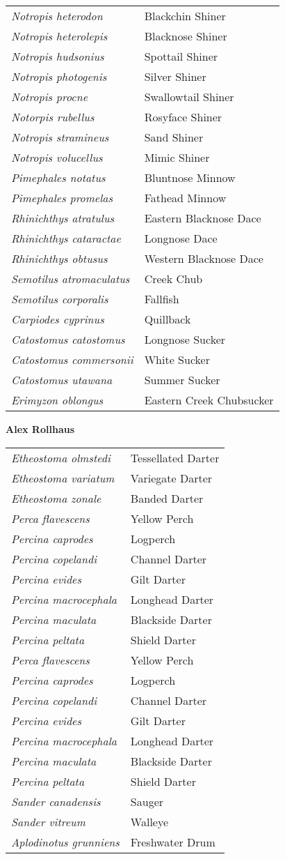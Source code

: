 \documentclass[11pt]{article}
\begin{document}
%
\textbf{\Student}

\begin{tabular}{@{}L{3in}L{3in}@{}}
\textit{Notropis heterodon} & Blackchin Shiner\tabularnewline
\textit{Notropis heterolepis} & Blacknose Shiner\tabularnewline
\textit{Notropis hudsonius} & Spottail Shiner\tabularnewline
\textit{Notropis photogenis} & Silver Shiner\tabularnewline
\textit{Notropis procne} & Swallowtail Shiner\tabularnewline
\textit{Notorpis rubellus} & Rosyface Shiner\tabularnewline
\textit{Notropis stramineus} & Sand Shiner\tabularnewline
\textit{Notropis volucellus} & Mimic Shiner\tabularnewline
\textit{Pimephales notatus} & Bluntnose Minnow\tabularnewline
\textit{Pimephales promelas} & Fathead Minnow\tabularnewline
\textit{Rhinichthys atratulus} & Eastern Blacknose Dace\tabularnewline
\textit{Rhinichthys cataractae} & Longnose Dace\tabularnewline
\textit{Rhinichthys obtusus} & Western Blacknose Dace\tabularnewline
\textit{Semotilus atromaculatus} & Creek Chub\tabularnewline
\textit{Semotilus corporalis} & Fallfish\tabularnewline
\textit{Carpiodes cyprinus} & Quillback\tabularnewline
\textit{Catostomus catostomus} & Longnose Sucker\tabularnewline
\textit{Catostomus commersonii} & White Sucker\tabularnewline
\textit{Catostomus utawana} & Summer Sucker\tabularnewline
\textit{Erimyzon oblongus} & Eastern Creek Chubsucker\tabularnewline
\end{tabular}

\newpage

\textbf{Alex Rollhaus}

\begin{tabular}{@{}L{3in}L{3in}@{}}
\textit{Etheostoma olmstedi} & Tessellated Darter\tabularnewline
\textit{Etheostoma variatum} & Variegate Darter\tabularnewline
\textit{Etheostoma zonale} & Banded Darter\tabularnewline
\textit{Perca flavescens} & Yellow Perch\tabularnewline
\textit{Percina caprodes} & Logperch\tabularnewline
\textit{Percina copelandi} & Channel Darter\tabularnewline
\textit{Percina evides} & Gilt Darter\tabularnewline
\textit{Percina macrocephala} & Longhead Darter\tabularnewline
\textit{Percina maculata} & Blackside Darter\tabularnewline
\textit{Percina peltata} & Shield Darter\tabularnewline
\textit{Perca flavescens} & Yellow Perch\tabularnewline
\textit{Percina caprodes} & Logperch\tabularnewline
\textit{Percina copelandi} & Channel Darter\tabularnewline
\textit{Percina evides} & Gilt Darter\tabularnewline
\textit{Percina macrocephala} & Longhead Darter\tabularnewline
\textit{Percina maculata} & Blackside Darter\tabularnewline
\textit{Percina peltata} & Shield Darter\tabularnewline
\textit{Sander canadensis} & Sauger\tabularnewline
\textit{Sander vitreum} & Walleye\tabularnewline
\textit{Aplodinotus grunniens} & Freshwater Drum\tabularnewline
\end{tabular}
\end{document}
